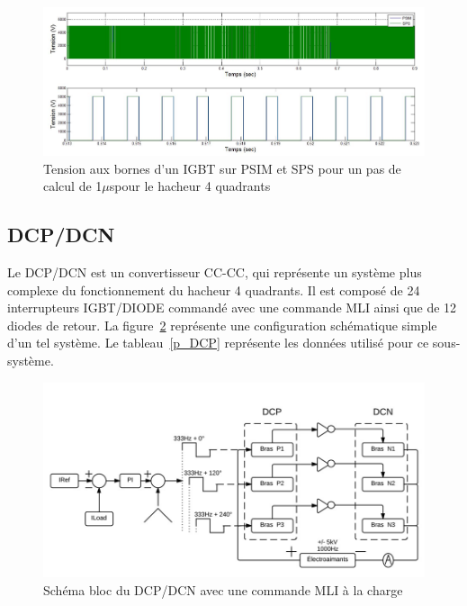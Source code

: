 \documentclass[11pt,letterpaper,final]{report}
\begin{document}
\begin{figure}[htb]
\centering
\includegraphics[scale=0.5]{Fig/Hacheur4Quadrants/HacheurTensionIGBT1u.jpg}
\caption{Tension aux bornes d'un IGBT sur PSIM et SPS pour un pas de calcul de 1$\mu$spour le hacheur 4 quadrants}
\label{hc_IG_ten_1}
\end{figure}


\clearpage
\subsection{DCP/DCN}
Le DCP/DCN est un convertisseur CC-CC, qui représente un système plus complexe du fonctionnement du hacheur 4 quadrants. Il est composé de 24 interrupteurs IGBT/DIODE commandé avec une commande MLI ainsi que de 12 diodes de retour. La figure~\ref{DC_DP} représente une configuration schématique simple d'un tel système. Le tableau~\ref{p_DCP} représente les données utilisé pour ce sous-système.

\begin{figure}[htb]
\centering
\includegraphics[scale=0.5]{Fig/DCPDCN/DCP.jpg}
\caption{Schéma bloc du DCP/DCN avec une commande MLI à la charge}
\label{DC_DP}
\end{figure}
\end{document}
